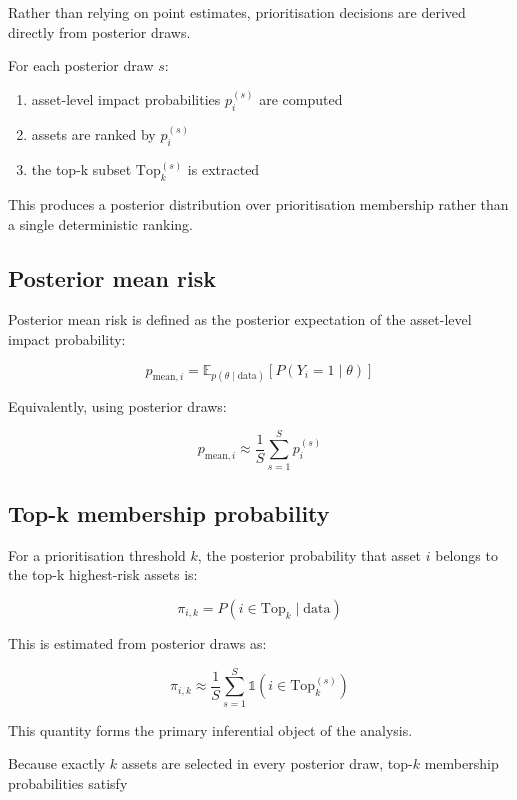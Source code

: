 \documentclass[
]{article}
\providecommand{\tightlist}{%
  \setlength{\itemsep}{0pt}\setlength{\parskip}{0pt}}
\begin{document}
Rather than relying on point estimates, prioritisation decisions are
derived directly from posterior draws.

For each posterior draw \(s\):

\begin{enumerate}
\def\labelenumi{\arabic{enumi}.}
\tightlist
\item
  asset-level impact probabilities \(p_i^{(s)}\) are computed
\item
  assets are ranked by \(p_i^{(s)}\)
\item
  the top-k subset \(\text{Top}_k^{(s)}\) is extracted
\end{enumerate}

This produces a posterior distribution over prioritisation membership
rather than a single deterministic ranking.

\subsection{Posterior mean risk}\label{posterior-mean-risk}

Posterior mean risk is defined as the posterior expectation of the
asset-level impact probability:

\[
p_{\text{mean}, i}
=
\mathbb{E}_{p(\theta \mid \text{data})}
\left[
P(Y_i = 1 \mid \theta)
\right]
\]

Equivalently, using posterior draws:

\[
p_{\text{mean}, i}
\approx
\frac{1}{S}
\sum_{s=1}^{S}
p_i^{(s)}
\]

\subsection{Top-k membership
probability}\label{top-k-membership-probability}

For a prioritisation threshold \(k\), the posterior probability that
asset \(i\) belongs to the top-k highest-risk assets is:

\[
\pi_{i,k}
=
P(i \in \text{Top}_k \mid \text{data})
\]

This is estimated from posterior draws as:

\[
\pi_{i,k}
\approx
\frac{1}{S}
\sum_{s=1}^{S}
\mathbb{1}
\left(
i \in \text{Top}_k^{(s)}
\right)
\]

This quantity forms the primary inferential object of the analysis.

Because exactly \(k\) assets are selected in every posterior draw,
top-\(k\) membership probabilities satisfy
\end{document}
